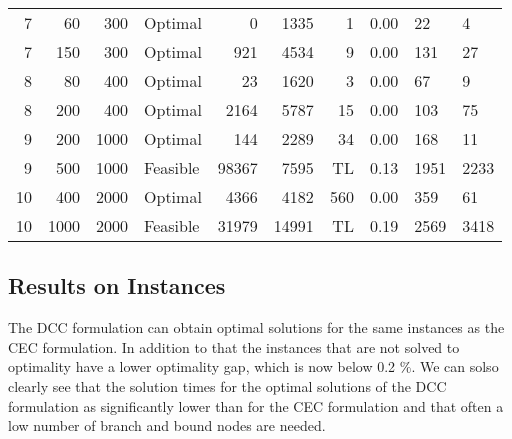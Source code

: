 \documentclass[11pt]{article}
\begin{document}
\begin{tabular}{rrrlrrrrll}
    7 &    60 &        300 &   Optimal &          0 &      1335 &             1 &         0.00 &     22 &      4 \\
    7 &   150 &        300 &   Optimal &        921 &      4534 &             9 &         0.00 &    131 &     27 \\
    8 &    80 &        400 &   Optimal &         23 &      1620 &             3 &         0.00 &     67 &      9 \\
    8 &   200 &        400 &   Optimal &       2164 &      5787 &            15 &         0.00 &    103 &     75 \\
    9 &   200 &       1000 &   Optimal &        144 &      2289 &            34 &         0.00 &    168 &     11 \\
    9 &   500 &       1000 &  Feasible &      98367 &      7595 &          TL &         0.13 &   1951 &   2233 \\
   10 &   400 &       2000 &   Optimal &       4366 &      4182 &           560 &         0.00 &    359 &     61 \\
   10 &  1000 &       2000 &  Feasible &      31979 &     14991 &          TL &         0.19 &   2569 &   3418 \\
\bottomrule
\end{tabular}
\subsection{Results on Instances}
The DCC formulation can obtain optimal solutions for the same instances as the CEC formulation. In addition to that the instances that are not solved to optimality have a lower optimality gap, which is now below 0.2 $\%$. We can solso clearly see that the solution times for the optimal solutions of the DCC formulation as significantly lower than for the CEC formulation and that often a low number of branch and bound nodes are needed.
\end{document}
